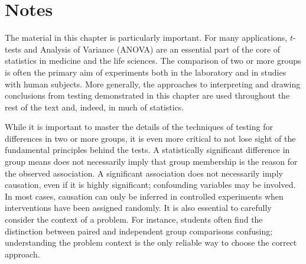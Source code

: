 \section{Notes}
\label{inferenceForNumericalDataNotes}


The material in this chapter is particularly important.  For many applications, $t$-tests and Analysis of Variance (ANOVA) are an essential part of the core of statistics in medicine and the life sciences.  The comparison of two or more groups is often the primary aim of experiments both in the laboratory and in studies with human subjects. More generally, the approaches to interpreting and drawing conclusions from testing demonstrated in this chapter are used throughout the rest of the text and, indeed, in much of statistics.  

While it is important to master the details of the techniques of testing for differences in two or more groups, it is even more critical to not lose sight of the fundamental principles behind the tests.  A statistically significant difference in group means does not necessarily imply that group membership is the reason for the observed association. A significant association does not necessarily imply causation, even if it is highly significant; confounding variables may be involved. In most cases, causation can only be inferred in controlled experiments when interventions have been assigned randomly. It is also essential to carefully consider the context of a problem. For instance, students often find the distinction between paired and independent group comparisons confusing; understanding the problem context is the only reliable way to choose the correct approach.

